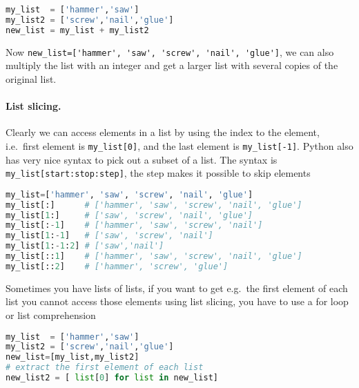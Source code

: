 \documentclass[graybox,sectrefs,envcountresetchap,open=right,final]{svmonodo}
\begin{document}
\begin{lstlisting}[language=python,style=blue1bar]
my_list  = ['hammer','saw']
my_list2 = ['screw','nail','glue']
new_list = my_list + my_list2

\end{lstlisting}

Now \Verb!new_list=['hammer', 'saw', 'screw', 'nail', 'glue']!, we can also multiply the list with an integer and get a larger list with several copies of the original list.

\paragraph{List slicing.}
Clearly we can access elements in a list by using the index to the element, i.e.~first element is \Verb!my_list[0]!, and the last element is \Verb!my_list[-1]!. Python also has very nice syntax to pick out a subset of a list. The syntax is \Verb!my_list[start:stop:step]!, the step makes it possible to skip elements









\begin{lstlisting}[language=python,style=blue1bar]
my_list=['hammer', 'saw', 'screw', 'nail', 'glue']
my_list[:]      # ['hammer', 'saw', 'screw', 'nail', 'glue']
my_list[1:]     # ['saw', 'screw', 'nail', 'glue']
my_list[:-1]    # ['hammer', 'saw', 'screw', 'nail']
my_list[1:-1]   # ['saw', 'screw', 'nail']
my_list[1:-1:2] # ['saw','nail']
my_list[::1]    # ['hammer', 'saw', 'screw', 'nail', 'glue']
my_list[::2]    # ['hammer', 'screw', 'glue']

\end{lstlisting}


Sometimes you have lists of lists, if you want to get e.g.~the first element of each list you cannot access those elements using list slicing, you have to use a for loop or list comprehension






\begin{lstlisting}[language=python,style=blue1bar]
my_list  = ['hammer','saw']
my_list2 = ['screw','nail','glue']
new_list=[my_list,my_list2]
# extract the first element of each list
new_list2 = [ list[0] for list in new_list]

\end{lstlisting}
\end{document}
